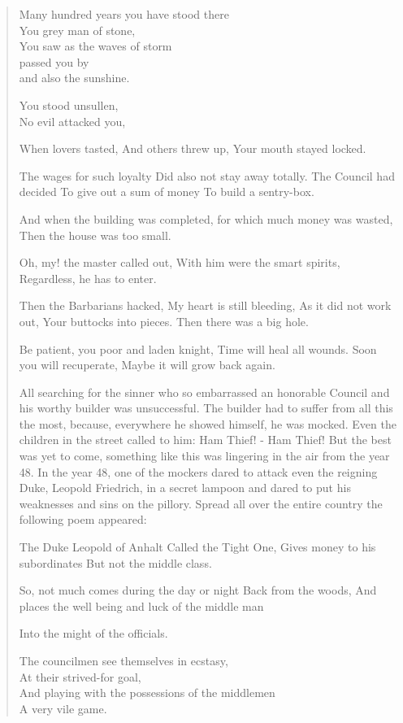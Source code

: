 \documentclass{article}
\begin{document}
\begin{quote}
Many hundred years you have stood there\\
You grey man of stone,\\
You saw as the waves of storm\\
passed you by\\
and also the sunshine.

You stood unsullen,\\
No evil attacked you,

When lovers tasted,
And others threw up,
Your mouth stayed locked.

The wages for such loyalty
Did also not stay away totally.
The Council had decided
To give out a sum of money
To build a sentry-box.

And when the building was completed,
for which much money was wasted,
Then the house was too small.

Oh, my! the master called out,
With him were the smart spirits,
Regardless, he has to enter.

Then the Barbarians hacked,
My heart is still bleeding,
As it did not work out,
Your buttocks into pieces.
Then there was a big hole.

Be patient, you poor
and laden knight,
Time will heal all wounds.
Soon you will recuperate,
Maybe it will grow back again.

All searching for the sinner who so embarrassed an honorable Council and his worthy builder was unsuccessful. The builder had to suffer from all this the most, because, everywhere he showed himself, he was mocked. Even the children in the street called to him: Ham Thief! - Ham Thief! But the best was yet to come, something like this was lingering in the air from the year 48. In the year 48, one of the mockers dared to attack even the reigning Duke, Leopold Friedrich, in a secret lampoon and dared to put his weaknesses and sins on the pillory. Spread all over the entire country the following poem appeared:

The Duke Leopold of Anhalt
Called the Tight One,
Gives money to his subordinates
But not the middle class.

So, not much comes during the day or night
Back from the woods,
And places the well being and luck of the middle man

Into the might of the officials.

The councilmen see themselves in ecstasy,\\
At their strived-for goal,\\
And playing with the possessions of the middlemen\\
A very vile game.


\end{quote}
\end{document}
